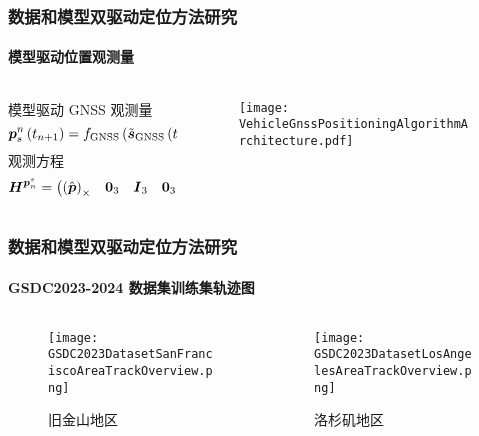 \begin{frame}
	\frametitle{数据和模型双驱动定位方法研究}
	\framesubtitle{模型驱动位置观测量}
	\begin{columns}[t]
		\begin{column}{0.5\textwidth}
		    \vspace{-1.0cm}
			\begin{block}{模型驱动 GNSS 观测量}
			{
				\tiny
				\begin{equation*}
					\vb*{p}_{s}^{n}\left(t_{n+1}\right)
					=
					f_{\mathrm{GNSS}}\left(\tilde{\vb*{s}}_{\mathrm{GNSS}}\left(t_i\right)\right)
				\end{equation*}
			}
				观测方程
			{
				\tiny	
				\begin{equation*}
					\vb*{H}^{\vb*{p}^s_{n}} 
					= 
					\begin{pmatrix}
						\left(\hat{\vb*{p}}\right)_{\times}
						&\vb*{0}_3
						&\vb*{I}_3
						&\vb*{0}_3
						&\vb*{0}_3
						&\vb*{0}_3
						&\vb*{0}_3
					\end{pmatrix}
				\end{equation*}	
		   	}
		   	\end{block}
		\end{column}   
		\begin{column}{0.5\textwidth}
		    \vspace{-1.5cm}
		   	\begin{figure}
		   	\centering
		   	    \texttt{[image: VehicleGnssPositioningAlgorithmArchitecture.pdf]}
		   	\end{figure}
		\end{column}
	\end{columns}  
\end{frame}

 \begin{frame} 
 	\frametitle{数据和模型双驱动定位方法研究}
 	\framesubtitle{GSDC2023-2024 数据集训练集轨迹图}
	\begin{columns}
		\begin{column}{0.5\textwidth}
		   	\begin{figure}
			    \texttt{[image: GSDC2023DatasetSanFranciscoAreaTrackOverview.png]}
			    \caption{旧金山地区}
		   	\end{figure} 
		\end{column}   
		\begin{column}{0.5\textwidth}
		   	\begin{figure}
			    \texttt{[image: GSDC2023DatasetLosAngelesAreaTrackOverview.png]}
			    \caption{洛杉矶地区}
		   	\end{figure} 
		\end{column}
	\end{columns} 
\end{frame}
 
